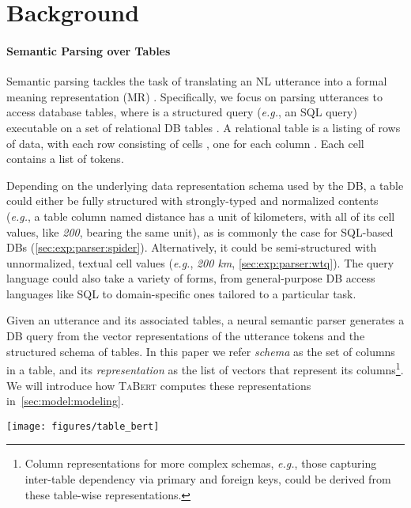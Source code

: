 \documentclass[11pt,a4paper]{article}
\def\model/{\textsc{TaBert}}
\renewcommand{\tt}[1]{\fontfamily{cmtt}\selectfont #1}
\newcommand{\eg}{\hbox{\emph{e.g.}}\xspace}
\def\wtq/{\textsc{WikiTableQuestions}}
\begin{document}
\section{Background}




\paragraph{Semantic Parsing over Tables}
Semantic parsing tackles the task of translating an NL utterance  into a formal meaning representation (MR) .
Specifically, we focus on parsing utterances to access database tables, where  is a structured query (\eg, an SQL query) executable on a set of relational DB tables .
A relational table  is a listing of  rows  of data, with each row  consisting of  cells , one for each column .
Each cell  contains a list of tokens. 

Depending on the underlying data representation schema used by the DB, a table could either be fully structured with strongly-typed and normalized contents (\eg, a table column named {\tt distance} has a unit of {\tt kilometers}, with all of its cell values, like \textit{200}, 
bearing the same unit), as is commonly the case for SQL-based DBs (\autoref{sec:exp:parser:spider}).
Alternatively, it could be semi-structured with unnormalized, textual cell values (\eg, \textit{200 km}, \autoref{sec:exp:parser:wtq}).
The query language could also take a variety of forms, from general-purpose DB access languages like SQL to domain-specific ones tailored to a particular task.

Given an utterance and its associated tables, a neural semantic parser generates a DB query from the vector representations of the utterance tokens and the structured schema of tables.
In this paper we refer \emph{schema} as the set of columns in a table, and its \emph{representation} as the list of vectors that represent its columns\footnote{Column representations for more complex schemas, \eg, those capturing inter-table dependency via primary and foreign keys, could be derived from these table-wise representations.}.
We will introduce how \model/ computes these representations in~\autoref{sec:model:modeling}. 


\begin{figure*}[t!]
	\centering
	\texttt{[image: figures/table\_bert]}
	\caption{Overview of \model/ for learning representations of utterances and table schemas with an example from \wtq/\footnotemark. \textbf{(A)} A content snapshot of the table is created based on the input NL utterance. \textbf{(B)} Each row in the snapshot is encoded by a Transformer (only  is shown), producing row-wise encodings for utterance tokens and cells. \textbf{(C)} All row-wise encodings are aligned and processed by  vertical self-attention layers, generating utterance and column representations.}
\label{fig:model:overview}
	\vspace{-3mm}
\end{figure*}
\end{document}
